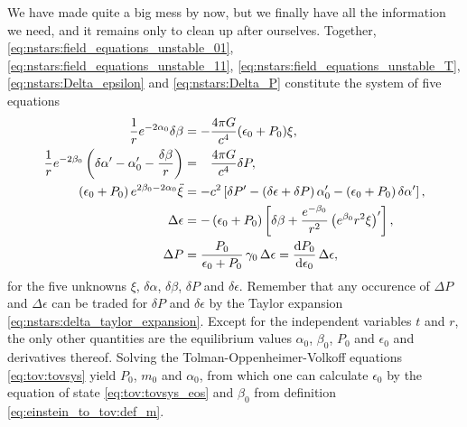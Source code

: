 We have made quite a big mess by now, but we finally have all the information we need, and it remains only to clean up after ourselves.
Together, \eqref{eq:nstars:field_equations_unstable_01}, \eqref{eq:nstars:field_equations_unstable_11}, \eqref{eq:nstars:field_equations_unstable_T}, \eqref{eq:nstars:Delta_epsilon} and \eqref{eq:nstars:Delta_P} constitute the system of five equations
\begin{subequations}
\begin{align}
	\frac{1}{r} e^{-2\alpha_0} \delta\beta                                                      &= -           \frac{4 \pi G}{c^4} (\epsilon_0 + P_0) \xi , \label{eq:nstars:perturbation_system_01} \\
	\frac{1}{r} e^{-2\beta_0} \left( \delta\alpha' - \alpha_0' - \frac{\delta \beta}{r} \right) &= \phantom{-} \frac{4 \pi G}{c^4} \delta P               , \label{eq:nstars:perturbation_system_11} \\
	\left( \epsilon_0 + P_0 \right) e^{2 \beta_0 - 2 \alpha_0} \ddot \xi                                                        &= -c^2 \left[ \delta P' - \left( \delta \epsilon + \delta P \right) \alpha_0' - \left( \epsilon_0 + P_0 \right) \delta \alpha' \right] , \label{eq:nstars:perturbation_system_euler} \\
	\Delta \epsilon                                                                                                             &= - \left( \epsilon_0 + P_0 \right) \left[ \delta\beta + \frac{e^{-\beta_0}}{r^2} \left( e^{\beta_0} r^2 \xi \right)' \right]  , \label{eq:nstars:perturbation_system:energy_conservation} \\
	\Delta P &= \frac{P_0}{\epsilon_0 + P_0} \, \gamma_0 \, \Delta \epsilon = \odv{P_0}{\epsilon_0} \, \Delta\epsilon, \label{eq:nstars:perturbation_system_adiabadicity}
\end{align}%
\label{eq:nstars:perturbation_system}%
\end{subequations}%
for the five unknowns $\xi$, $\delta \alpha$, $\delta \beta$, $\delta P$ and $\delta \epsilon$.
Remember that any occurence of $\Delta P$ and $\Delta \epsilon$ can be traded for $\delta P$ and $\delta \epsilon$ by the Taylor expansion \eqref{eq:nstars:delta_taylor_expansion}.
Except for the independent variables $t$ and $r$, the only other quantities are the equilibrium values $\alpha_0$, $\beta_0$, $P_0$ and $\epsilon_0$ and derivatives thereof.
Solving the Tolman-Oppenheimer-Volkoff equations \eqref{eq:tov:tovsys} yield $P_0$, $m_0$ and $\alpha_0$, from which one can calculate $\epsilon_0$ by the equation of state \eqref{eq:tov:tovsys_eos} and $\beta_0$ from definition \eqref{eq:einstein_to_tov:def_m}.

